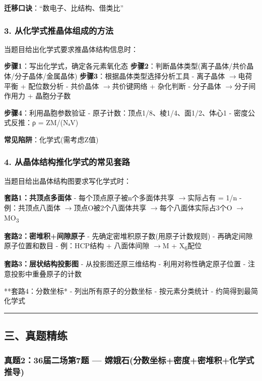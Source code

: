 \documentclass[a4paper,11pt]{ctexart}
\newcommand{\箭}{\ensuremath{\rightarrow}}
\newcommand{\左箭}{\ensuremath{\leftarrow}}
\newcommand{\上箭}{\ensuremath{\uparrow}}
\newcommand{\下箭}{\ensuremath{\downarrow}}
\newcommand{\衡}{\ensuremath{\rightleftharpoons}}
\newcommand{\双箭}{\ensuremath{\leftrightarrow}}
\newcommand{\约等于}{\ensuremath{\approx}}
\newcommand{\小于等于}{\ensuremath{\leq}}
\newcommand{\大于等于}{\ensuremath{\geq}}
\newcommand{\不等于}{\ensuremath{\neq}}
\newcommand{\西格马}{\ensuremath{\sigma}}
\newcommand{\派}{\ensuremath{\pi}}
\begin{document}
\textbf{迁移口诀}：``数电子、比结构、借类比''

\subsubsection{3. 从化学式推晶体组成的方法}\label{ux4eceux5316ux5b66ux5f0fux63a8ux6676ux4f53ux7ec4ux6210ux7684ux65b9ux6cd5}

当题目给出化学式要求推晶体结构信息时：

\textbf{步骤1}：写出化学式，确定各元素氧化态
\textbf{步骤2}：判断晶体类型(离子晶体/共价晶体/分子晶体/金属晶体)
\textbf{步骤3}：根据晶体类型选择分析工具
- 离子晶体 \箭 电荷平衡 + 配位数分析
- 共价晶体 \箭 共价键网络 + 杂化判断
- 分子晶体 \箭 分子间作用力 + 晶胞分子数

\textbf{步骤4}：利用晶胞参数验证
- 原子计数：顶点1/8、棱1/4、面1/2、体心1
- 密度公式反推：ρ = ZM/(NₐV)

\textbf{常见陷阱}：化学式(需考虑Z值)

\subsubsection{4. 从晶体结构推化学式的常见套路}\label{ux4eceux6676ux4f53ux7ed3ux6784ux63a8ux5316ux5b66ux5f0fux7684ux5e38ux89c1ux5957ux8def}

当题目给出晶体结构图要求写化学式时：

\textbf{套路1：共顶点多面体}
- 每个顶点原子被n个多面体共享 \箭 实际占有 = 1/n
- 例：共顶点八面体 \箭 顶点O被2个八面体共享 \箭 每个八面体实际占3个O \箭 MO\textsubscript{3}

\textbf{套路2：密堆积+间隙原子}
- 先确定密堆积原子数(用原子计数规则)
- 再确定间隙原子位置和数目
- 例：HCP结构 + 八面体间隙 \箭 M + X\textsubscript{6}配位

\textbf{套路3：层状结构投影图}
- 从投影图还原三维结构
- 利用对称性确定原子位置
- 注意投影中重叠原子的计数

**套路4：分数坐标*
- 列出所有原子的分数坐标
- 按元素分类统计
- 约简得到最简化学式

\begin{center}\rule{0.5\linewidth}{0.5pt}\end{center}

\subsection{三、真题精练}\label{ux4e09ux771fux9898ux7cbeux7ec3-5}

\subsubsection{真题2：36届二场第7题 --- 嫦娥石(分数坐标+密度+密堆积+化学式推导)}\label{ux771fux9898236ux5c4aux4e8cux573aux7b2c7ux9898-ux5ae6ux5a25ux77f3ux5206ux6570ux5750ux6807ux5bc6ux5ea6ux5bc6ux5806ux79efux5316ux5b66ux5f0fux63a8ux5bfc}
\end{document}
